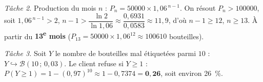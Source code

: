 \emph{Tâche 2.} Production du mois $n$ : $P_n=50000\times1{,}06^{\,n-1}$. On résout
$P_n>100000$, soit $1{,}06^{\,n-1}>2$, $n-1>\dfrac{\ln 2}{\ln 1{,}06}\approx\dfrac{0{,}6931}{0{,}0583}\approx11{,}9$,
d'où $n-1\ge12$, $n\ge13$. À partir du \textbf{13\textsuperscript{e} mois}
($P_{13}=50000\times1{,}06^{12}\approx\num{100610}$ bouteilles).

\emph{Tâche 3.} Soit $Y$ le nombre de bouteilles mal étiquetées parmi $10$ :
$Y\hookrightarrow\mathcal{B}(10\,;\,0{,}03)$. Le client refuse si $Y\ge1$ :
$P(Y\ge1)=1-(0{,}97)^{10}\approx1-0{,}7374=\mathbf{0{,}26}$, soit environ \SI{26}{\percent}.
